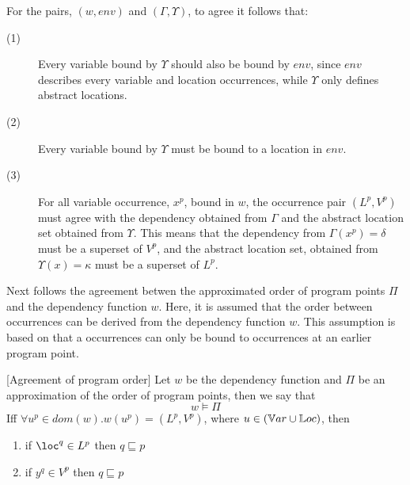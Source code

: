 \documentclass[../../master.tex]{subfiles}
\begin{document}
For the pairs, $(w,env)$ and $(\Gamma,\Upsilon)$, to agree it follows that:
\begin{description}
	\item[(1)] Every variable bound by $\Upsilon$ should also be bound by $env$, since $env$ describes every variable and location occurrences, while $\Upsilon$ only defines abstract locations.
	\item[(2)] Every variable bound by $\Upsilon$ must be bound to a location in $env$.
	\item[(3)] For all variable occurrence, $x^p$, bound in $w$, the occurrence pair $(L^p,V^p)$ must agree with the dependency obtained from $\Gamma$ and the abstract location set obtained from $\Upsilon$.
		This means that the dependency from $\Gamma(x^p)=\delta$ must be a superset of $V^p$, and the abstract location set, obtained from $\Upsilon(x)=\kappa$ must be a superset of $L^p$.
\end{description}

Next follows the agreement betwen the approximated order of program points $\Pi$ and the dependency function $w$.
Here, it is assumed that the order between occurrences can be derived from the dependency function $w$.
This assumption is based on that a occurrences can only be bound to occurrences at an earlier program point.



\begin{definition}{[Agreement of program order]}
	Let $w$ be the dependency function and $\Pi$ be an approximation of the order of program points, then we say that
	$$w\models\Pi$$
	Iff $\forall u^p\in dom(w).w(u^p)=(L^p,V^p)$, where $u\in(\mathbb{V}ar\cup\mathbb{L}oc)$, then
	\begin{enumerate}
		\item if $\loc^q\in L^p$ then $q\sqsubseteq p$
		\item if $y^q\in V^p$ then $q\sqsubseteq p$
	\end{enumerate}
	\iffalse
	\begin{itemize}
		\item $(p,q)\in\Pi \Rightarrow \exists x,y. x^p\in dom(w) \wedge y^q\in dom(w)$
		\item $w(u^p)=(L^p,V^p)$, where $u\in\Var\cup\Loc)$, then
		\begin{enumerate}
			\item if $\loc^q\in L^p$ then $q\sqsubseteq p$
			\item if $y^q\in V^p$ then $q\sqsubseteq p$
		\end{enumerate}
	\end{itemize}
	\fi
\end{definition}
\end{document}
